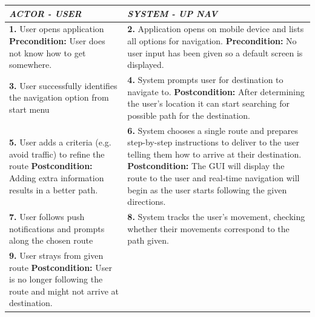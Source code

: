\documentclass[a4paper,12pt]{article}
\begin{document}
\begin{table}[!htbp]
\footnotesize
\label{tab:table 2.2}
\bgroup
\def\arraystretch{1.3}
\begin{tabular}{|L|L|}
\hline
\textbf{\textit{ACTOR - USER}} & \textbf{\textit{SYSTEM - UP NAV}}
\\
\hline
\textbf{1.} User opens application \linebreak \linebreak
\textbf{Precondition:} User does not know how to get somewhere. & \textbf{2.} Application opens on mobile device and lists all options for navigation. \linebreak \linebreak
\textbf{Precondition:} No user input has been given so a default screen is displayed.
\\
\hline
\textbf{3.} User successfully identifies the navigation option from start menu \linebreak \linebreak
& \textbf{4.} System prompts user for destination to navigate to. \linebreak \linebreak
\textbf{Postcondition:} After determining the user's location it can start searching for possible path for the destination.
\\
\hline
\textbf{5.} User adds a criteria (e.g. avoid traffic) to refine the route \linebreak \linebreak
\textbf{Postcondition:} Adding extra information results in a better path.
& \textbf{6.} System chooses a single route and prepares step-by-step instructions to deliver to the user telling them how to arrive at their destination. \linebreak \linebreak 
\textbf{Postcondition:} The GUI will display the route to the user and real-time navigation will begin as the user starts following the given directions.
\\
\hline
\textbf{7.} User follows push notifications and prompts along the chosen route \linebreak
& \textbf{8.} System tracks the user's movement, checking whether their movements correspond to the path given. \linebreak
\\
\hline
\textbf{9.} User strays from given route \linebreak \linebreak
\textbf{Postcondition:} User is no longer following the route and might not arrive at destination.

\end{tabular}
\end{table}
\end{document}
